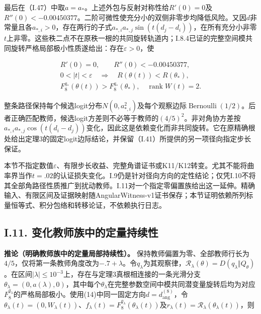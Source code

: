 \documentclass[11pt,a4paper]{article}
\begin{document}
最后在（I.47）中取\(a=a_*\)。上述外包与反射对称性给\(R'(0)=0\)及\(R''(0)<-0.00450377\)。二阶可微性使充分小的双侧非零步均降低风险。又因\(d\)非常量且各\(a_{*,i}>0\)，存在两行的子式\(a_{*,i}a_{*,j}\sin(t(d_j-d_i))\)，在所有充分小非零\(t\)上非零。这些秩二点不在原秩一根的共同旋转轨道内；I.8.4已证的完整空间模共同旋转严格局部极小性质遂给出：存在\(\varepsilon>0\)，使

\[
\begin{gathered}
R'(0)=0,\qquad R''(0)<-0.00450377,\\
0<|t|<\varepsilon\quad\Longrightarrow\quad
R(\theta(t))<R(\theta_*),\\
F_8^{q_*}(\theta(t))>F_8^{q_*}(\theta_*),\quad\operatorname{rank}W(t)=2.
\end{gathered}
\tag{I.55}
\]

整条路径保持每个候选logit分布\(N(0,a_{*,i}^2)\)及每个观察边际\(\operatorname{Bernoulli}(1/2)\)。后者正确匹配教师，候选logit方差则不必等于教师的\((4/5)^2\)。非对角协方差按\(a_{*,i}a_{*,j}\cos(t(d_i-d_j))\)变化，因此这是依赖变化而非共同旋转。它在原精确根处给出定理3的固定logit边际结论，并保留（I.41）所提供的另一项径向指定步长保证。

本节不指定数值\(\varepsilon\)、有限步长收益、完整角谱证书或K11/K12转变。尤其不能将曲率界当作\(t=.02\)的认证损失变化。I.9仍是针对径向方向的定性结论；仅凭I.10不将其全部角路径性质推广到扰动教师。I.11对一个指定零偏置族给出这一延伸。精确输入、有限区间及证据映射随AngularWitness-v1证书保存；本节证明依赖所列标量恒等式、积分包络和转移论证，不依赖执行日志。

\subsection*{I.11.
变化教师族中的定量持续性}\label{quantitative-teacher-family}

\protect{}\label{teacher-family-full-statement}
\textbf{推论（明确教师族中的定量局部持续性）。}
保持教师偏置为零、全部教师行长为\(4/5\)，仅将第一条教师角度改为\(-.7+\lambda\)。令\(q_\lambda\)为其观察律，\(\mathcal R_\lambda(\theta)=D(q_\lambda\Vert Q_\theta)\)。在区间\(|\lambda|\le10^{-3}\)上，存在与定理3真根相连接的一条光滑分支\(\theta_\lambda=(0,a(\lambda),0)\)，其中每个\(\theta_\lambda\)在完整参数空间中模共同潜变量旋转后均为对应\(F_8^{q_\lambda}\)的严格局部极小。使用(14)中同一固定方向\(d=d_{\mathrm{ang}}^{(8)}\)，令\(\theta_\lambda(t)=(0,W_\lambda(t))\)、\(f_\lambda(t)=F_8^{q_\lambda}(\theta_\lambda(t))\)及\(r_\lambda(t)=\mathcal R_\lambda(\theta_\lambda(t))\)，则
\end{document}
